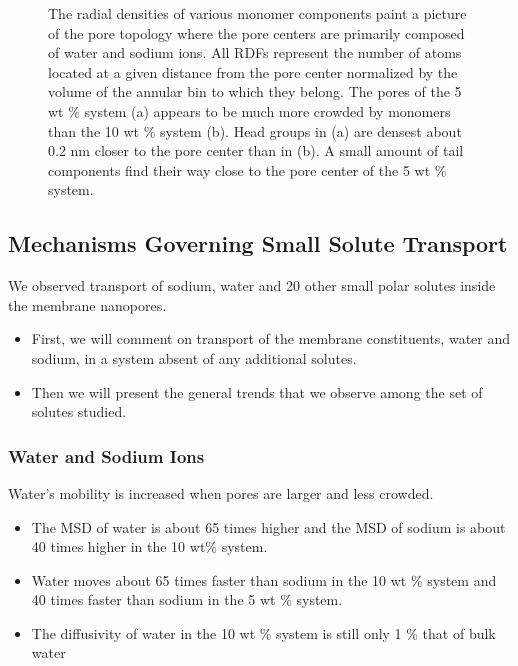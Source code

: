 \documentclass{article}
\begin{document}
\begin{figure}[!htb]
  \caption{The radial densities of various monomer components paint a picture of the
  pore topology where the pore centers are primarily composed of water and sodium ions.
  All RDFs represent the number of atoms located at a given distance from the pore center
  normalized by the volume of the annular bin to which they belong. The pores of the 5 
  wt \% system (a) appears to be much more crowded by monomers than the 10 wt \% system (b).
  Head groups in (a) are densest about 0.2 nm closer to the pore center than in (b). 
  A small amount of tail components find their way close to the pore center of the 5 wt \% system.
  }\label{fig:component_densities}
  \end{figure}

  \subsection*{Mechanisms Governing Small Solute Transport}\label{section:mechanism_overview}

  We observed transport of sodium, water and 20 other small polar solutes inside the
  membrane nanopores. 
  \begin{itemize}
  	\item First, we will comment on transport of the membrane constituents, water and sodium,
  	in a system absent of any additional solutes.
    \item Then we will present the general trends that we observe among the set of 
    solutes studied.
  \end{itemize}
  
  \subsubsection*{Water and Sodium Ions}\label{section:transport_water_sodium}

  \noindent Water's mobility is increased when pores are larger and less crowded.
  \begin{itemize}
    \item The MSD of water is about 65 times higher and the MSD of sodium is about 40
    times higher in the 10 wt\% system.
    \item Water moves about 65 times faster than sodium in the 10 wt \% system and
    40 times faster than sodium in the 5 wt \% system. %
    \item The diffusivity of water in the 10 wt \% system is still only 1 \% that of 
    bulk water %
  \end{itemize}
  
\end{document}
